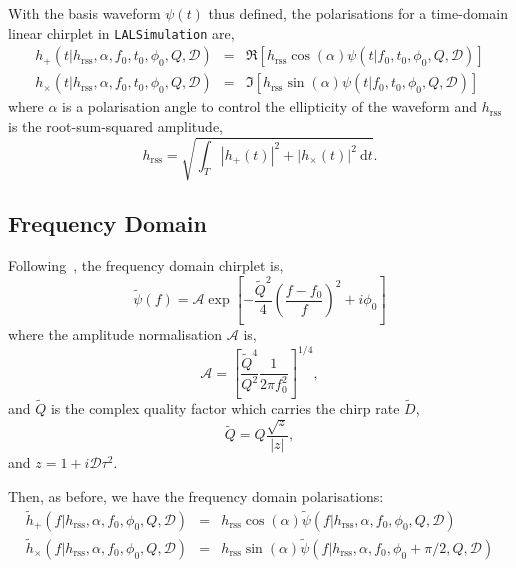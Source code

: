 \documentclass[11pt]{ligovirgodcc}
\begin{document}
With the basis waveform $\psi(t)$ thus defined, the polarisations for a
time-domain linear chirplet in {\tt LALSimulation} are,
\begin{eqnarray}
h_+(t|h_{\mathrm{rss}},\alpha,f_0,t_0,\phi_0,Q,\mathcal{D}) & = &
\Re\left[h_{\mathrm{rss}} \cos (\alpha)
\psi(t|f_0,t_0,\phi_0,Q,\mathcal{D})\right] \\
h_{\times}(t|h_{\mathrm{rss}},\alpha,f_0,t_0,\phi_0,Q,\mathcal{D}) & = & \Im
\left[h_{\mathrm{rss}} \sin (\alpha) \psi(t|f_0,t_0,\phi_0,Q,\mathcal{D})
\right]
\end{eqnarray}
%
where $\alpha$ is a polarisation angle to control the ellipticity of the
waveform and $h_{\mathrm{rss}}$ is the root-sum-squared amplitude,
\begin{equation}
\label{eq:hrss}
h_{\mathrm{rss}} = \sqrt{\int_T |h_+(t)|^2 + |h_{\times}(t)|^2~\mathrm{d}t}.
\end{equation}
%
\subsection{Frequency Domain}
Following~\cite{2010CQGra..27s4017C}, the frequency domain chirplet is, 
\begin{equation}
\tilde{\psi}(f) = \mathcal{A} \exp \left[ - \frac{\tilde{Q}^2}{4}
\left(\frac{f-f_0}{f}\right)^2 + i\phi_0\right]
\end{equation}
%
where the amplitude normalisation $\mathcal{A}$ is,
\begin{equation}
{\mathcal A} = \left[ \frac{\tilde{Q}^4}{Q^2}\frac{1}{2\pi f_0^2} \right]^{1/4},
\end{equation}
%
and $\tilde{Q}$ is the complex quality factor which carries the chirp rate
$\tilde{D}$,
\begin{equation}
\tilde{Q} = Q\frac{\sqrt{z}}{|z|},
\end{equation}
%
and $z = 1 + i\mathcal{D} \tau^2$.

Then, as before, we have the frequency domain polarisations:
\begin{eqnarray}
\tilde{h}_+(f|h_{\mathrm{rss}},\alpha,f_0,\phi_0,Q,\mathcal{D}) & = &
h_{\mathrm{rss}} \cos (\alpha)
\tilde{\psi}(f|h_{\mathrm{rss}},\alpha,f_0,\phi_0,Q,\mathcal{D}) \\
\tilde{h}_{\times}(f|h_{\mathrm{rss}},\alpha,f_0,\phi_0,Q,\mathcal{D}) & = &
h_{\mathrm{rss}} \sin (\alpha)
\tilde{\psi}(f|h_{\mathrm{rss}},\alpha,f_0,\phi_0+\pi/2,Q,\mathcal{D}) 
\end{eqnarray}
\end{document}
